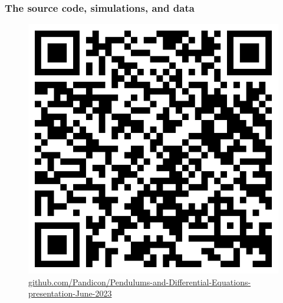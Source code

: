 \documentclass[aspectratio=169, t]{beamer}
\begin{document}
\begin{frame}
	\frametitle{The source code, simulations, and data}
	\centering
	\begin{figure}
		\includegraphics[height=0.6\textheight]{images/source-code-qr-code.png}
		\tiny
		\caption{\href{https://github.com/Pandicon/Pendulums-and-Differential-Equations-presentation-June-2023}{github.com/Pandicon/Pendulums-and-Differential-Equations-presentation-June-2023}}
	\end{figure}
\end{frame}
\end{document}
